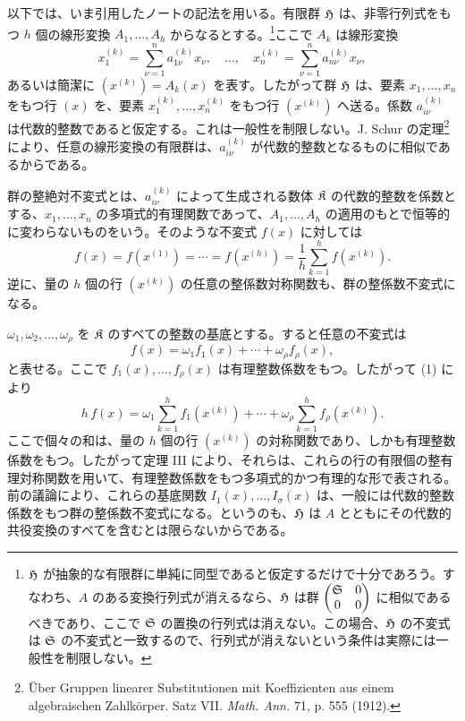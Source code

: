 \documentclass[11pt]{article}
\begin{document}
以下では、いま引用したノートの記法を用いる。有限群 \(\mathfrak H\) は、非零行列式をもつ \(h\) 個の線形変換 \(A_1,\ldots,A_h\) からなるとする。\footnote{\(\mathfrak H\) が抽象的な有限群に単純に同型であると仮定するだけで十分であろう。すなわち、\(A\) のある変換行列式が消えるなら、\(\mathfrak H\) は群 \(\begin{pmatrix}\mathfrak S&0\\0&0\end{pmatrix}\) に相似であるべきであり、ここで \(\mathfrak S\) の置換の行列式は消えない。この場合、\(\mathfrak H\) の不変式は \(\mathfrak S\) の不変式と一致するので、行列式が消えないという条件は実際には一般性を制限しない。}ここで \(A_k\) は線形変換
\[
        x_1^{(k)}=\sum_{\nu=1}^{n}a_{1\nu}^{(k)}x_\nu,
        \quad\ldots,\quad
        x_n^{(k)}=\sum_{\nu=1}^{n}a_{n\nu}^{(k)}x_\nu,
\]
あるいは簡潔に \((x^{(k)})=A_k(x)\) を表す。したがって群 \(\mathfrak H\) は、要素 \(x_1,\ldots,x_n\) をもつ行 \((x)\) を、要素 \(x_1^{(k)},\ldots,x_n^{(k)}\) をもつ行 \((x^{(k)})\) へ送る。係数 \(a_{i\nu}^{(k)}\) は代数的整数であると仮定する。これは一般性を制限しない。J. Schur の定理\footnote{Über Gruppen linearer Substitutionen mit Koeffizienten aus einem algebraischen Zahlkörper. Satz VII. \emph{Math. Ann.} 71, p. 555 (1912).}により、任意の線形変換の有限群は、\(a_{i\nu}^{(k)}\) が代数的整数となるものに相似であるからである。

群の整絶対不変式とは、\(a_{i\nu}^{(k)}\) によって生成される数体 \(\mathfrak K\) の代数的整数を係数とする、\(x_1,\ldots,x_n\) の多項式的有理関数であって、\(A_1,\ldots,A_h\) の適用のもとで恒等的に変わらないものをいう。そのような不変式 \(f(x)\) に対しては
\begin{equation}
        f(x)=f(x^{(1)})=\cdots=f(x^{(h)})
        =\frac1h\sum_{k=1}^{h}f(x^{(k)}).
\end{equation}
逆に、量の \(h\) 個の行 \((x^{(k)})\) の任意の整係数対称関数も、群の整係数不変式になる。

\(\omega_1,\omega_2,\ldots,\omega_\rho\) を \(\mathfrak K\) のすべての整数の基底とする。すると任意の不変式は
\[
        f(x)=\omega_1 f_1(x)+\cdots+\omega_\rho f_\rho(x),
\]
と表せる。ここで \(f_1(x),\ldots,f_\rho(x)\) は有理整数係数をもつ。したがって (1) により
\[
        h\,f(x)
        =
        \omega_1\sum_{k=1}^{h}f_1(x^{(k)})
        +\cdots+
        \omega_\rho\sum_{k=1}^{h}f_\rho(x^{(k)}).
\]
ここで個々の和は、量の \(h\) 個の行 \((x^{(k)})\) の対称関数であり、しかも有理整数係数をもつ。したがって定理 III により、それらは、これらの行の有限個の整有理対称関数を用いて、有理整数係数をもつ多項式的かつ有理的な形で表される。前の議論により、これらの基底関数 \(I_1(x),\ldots,I_\sigma(x)\) は、一般には代数的整数係数をもつ群の整係数不変式になる。というのも、\(\mathfrak H\) は \(A\) とともにその代数的共役変換のすべてを含むとは限らないからである。
\end{document}
